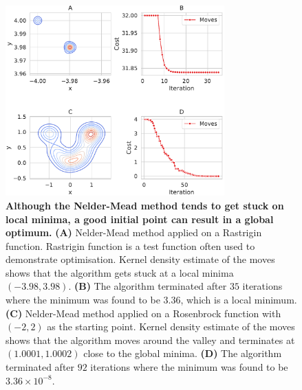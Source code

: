 \begin{figure}[H]
\center
\includegraphics[width=0.75\textwidth]{chapters/Introduction/Figures/Nelder-Mead.pdf}
\caption[Although the Nelder-Mead method tends to get stuck on local minima, a good initial point can result in a global optimum.]{\textbf{Although the Nelder-Mead method tends to get stuck on local minima, a good initial point can result in a global optimum.} \textbf{(A)} Nelder-Mead method applied on a Rastrigin function. Rastrigin function is a test function often used to demonstrate optimisation. Kernel density estimate of the moves shows that the algorithm gets stuck at a local minima $(-3.98, 3.98)$. \textbf{(B)} The algorithm terminated after $35$ iterations where the minimum was found to be $3.36$, which is a local minimum. \textbf{(C)} Nelder-Mead method applied on a Rosenbrock function with $(-2,2)$ as the starting point. Kernel density estimate of the moves shows that the algorithm moves around the valley and terminates at $(1.0001, 1.0002)$ close to the global minima. \textbf{(D)} The algorithm terminated after $92$ iterations where the minimum was found to be $3.36 \times 10^{-8}$.}%
\label{fig:nelder-mead}
\end{figure}